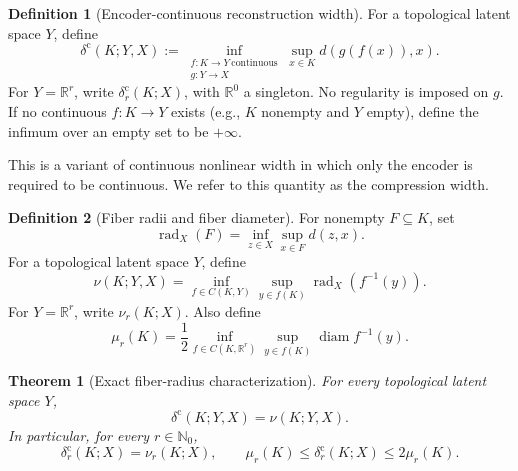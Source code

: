 \documentclass[11pt,a4paper]{article}
\theoremstyle{definition}
\newtheorem{definition}{Definition}[section]
\theoremstyle{plain}
\newtheorem{theorem}{Theorem}[section]
\theoremstyle{remark}
\DeclareMathOperator{\rad}{rad}
\DeclareMathOperator{\diam}{diam}
\begin{document}
\begin{definition}[Encoder-continuous reconstruction width]
\label{def:width}
For a topological latent space $Y$, define
\[
\delta^{\mathrm c}(K;Y,X)
:=
\inf_{\substack{f:K\to Y\ \mathrm{continuous}\\g:Y\to X}}
\sup_{x\in K}d(g(f(x)),x).
\]
For $Y=\mathbb R^r$, write $\delta_r^{\mathrm c}(K;X)$, with
$\mathbb R^0$ a singleton. No regularity is imposed on $g$. If no continuous $f:K\to Y$ exists (e.g., $K$ nonempty and $Y$ empty), define the infimum over an empty set to be $+\infty$.
\end{definition}

This is a variant of continuous nonlinear width in which only the encoder is
required to be continuous. We refer to this quantity as the compression
width.

\begin{definition}[Fiber radii and fiber diameter]
\label{def:fiber-widths}
For nonempty $F\subseteq K$, set
\[
\rad_X(F)=\inf_{z\in X}\sup_{x\in F}d(z,x).
\]
For a topological latent space $Y$, define
\[
\nu(K;Y,X)
=\inf_{f\in C(K,Y)}
  \sup_{y\in f(K)}\rad_X(f^{-1}(y)).
\]
For $Y=\mathbb R^r$, write $\nu_r(K;X)$. Also define
\[
\mu_r(K)
=\frac12\inf_{f\in C(K,\mathbb R^r)}
  \sup_{y\in f(K)}\diam f^{-1}(y).
\]
\end{definition}

\begin{theorem}[Exact fiber-radius characterization]
\label{thm:fiber-radius}
For every topological latent space $Y$,
\[
\delta^{\mathrm c}(K;Y,X)=\nu(K;Y,X).
\]
In particular, for every $r\in\mathbb N_0$,
\[
\delta_r^{\mathrm c}(K;X)=\nu_r(K;X),
\qquad
\mu_r(K)
\leq\delta_r^{\mathrm c}(K;X)
\leq2\mu_r(K).
\]
\end{theorem}
\end{document}
